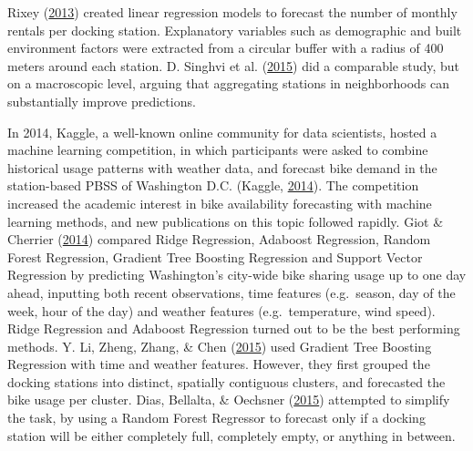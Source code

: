 \documentclass[12pt,oneside]{reedthesis}
\begin{document}
Rixey (\protect\hyperlink{ref-rixley2013}{2013}) created linear
regression models to forecast the number of monthly rentals per docking
station. Explanatory variables such as demographic and built environment
factors were extracted from a circular buffer with a radius of 400
meters around each station. D. Singhvi et al.
(\protect\hyperlink{ref-singhvi2015}{2015}) did a comparable study, but
on a macroscopic level, arguing that aggregating stations in
neighborhoods can substantially improve predictions.

In 2014, Kaggle, a well-known online community for data scientists,
hosted a machine learning competition, in which participants were asked
to combine historical usage patterns with weather data, and forecast
bike demand in the station-based PBSS of Washington D.C. (Kaggle,
\protect\hyperlink{ref-kaggle}{2014}). The competition increased the
academic interest in bike availability forecasting with machine learning
methods, and new publications on this topic followed rapidly. Giot \&
Cherrier (\protect\hyperlink{ref-giot2014}{2014}) compared Ridge
Regression, Adaboost Regression, Random Forest Regression, Gradient Tree
Boosting Regression and Support Vector Regression by predicting
Washington's city-wide bike sharing usage up to one day ahead, inputting
both recent observations, time features (e.g.~season, day of the week,
hour of the day) and weather features (e.g.~temperature, wind speed).
Ridge Regression and Adaboost Regression turned out to be the best
performing methods. Y. Li, Zheng, Zhang, \& Chen
(\protect\hyperlink{ref-li2015}{2015}) used Gradient Tree Boosting
Regression with time and weather features. However, they first grouped
the docking stations into distinct, spatially contiguous clusters, and
forecasted the bike usage per cluster. Dias, Bellalta, \& Oechsner
(\protect\hyperlink{ref-dias2015}{2015}) attempted to simplify the task,
by using a Random Forest Regressor to forecast only if a docking station
will be either completely full, completely empty, or anything in
between.
\end{document}
